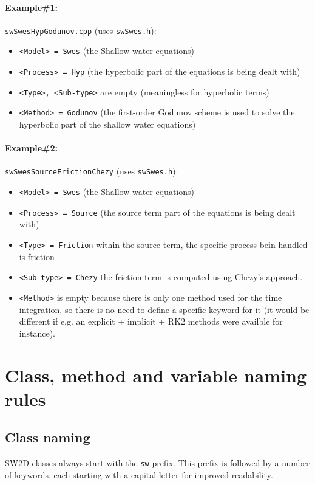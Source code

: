 \paragraph{Example\#1:} \texttt{swSwesHypGodunov.cpp} (uses \texttt{swSwes.h}): 
\begin{itemize}
\item \texttt{<Model> = Swes} (the Shallow water equations)
\item \texttt{<Process> = Hyp} (the hyperbolic part of the equations is being dealt with)
\item \texttt{<Type>, <Sub-type>} are empty (meaningless for hyperbolic terms)
\item \texttt{<Method> = Godunov} (the first-order Godunov scheme is used to solve the hyperbolic part of the shallow water equations)
\end{itemize}
\paragraph{Example\#2:} \texttt{swSwesSourceFrictionChezy} (uses \texttt{swSwes.h}):
\begin{itemize}
\item \texttt{<Model> = Swes} (the Shallow water equations)
\item \texttt{<Process> = Source} (the source term part of the equations is being dealt with)
\item \texttt{<Type> = Friction} within the source term, the specific process bein handled is friction
\item \texttt{<Sub-type> = Chezy} the friction term is computed using Chezy's approach.
\item \texttt{<Method>} is empty because there is only one method used for the time integration, so there is no need to define a specific keyword for it (it would be different if e.g. an explicit + implicit + RK2 methods were availble for instance).
\end{itemize}
%
%
%
%
\section{Class, method and variable naming rules}\label{sec_namingRules}
%
%
%
\subsection{Class naming}\label{subsec_classNamingRules}
SW2D classes always start with the \texttt{sw} prefix. This prefix is followed by a number of keywords, each starting with a capital letter for improved readability.

